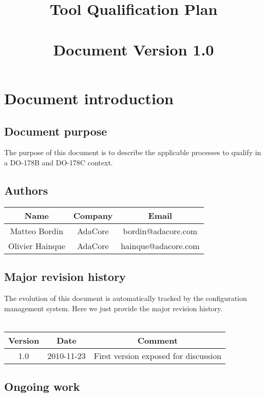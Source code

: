 \documentclass {report}
\begin{document}
\title{\huge
  \xcov{}\\
  Tool Qualification Plan\\ \ \\
  \large \textbf{Document Version 1.0}}

\maketitle
\tableofcontents

\chapter{Document introduction}

\section{Document purpose}
The purpose of this document is to describe the applicable processes to
qualify \xcov{} in a DO-178B and DO-178C context.

\section{Authors}
\begin{tabular}{|c|c|c|}
\hline
\textbf{Name} & \textbf{Company} & \textbf{Email} \\ \hline
Matteo Bordin & AdaCore & bordin@adacore.com \\ \hline
Olivier Hainque & AdaCore & hainque@adacore.com \\ \hline
\end{tabular}

\section{Major revision history}

The evolution of this document is automatically tracked by the configuration
management system. Here we just provide the major revision history.  \ \\ \\
\begin{tabular}{|c|c|c|}
\hline
\textbf{Version} & \textbf{Date} & \textbf{Comment} \\ \hline
1.0 & 2010-11-23 & First version exposed for discussion \\ \hline
\end{tabular}

\section{Ongoing work}
\end{document}

